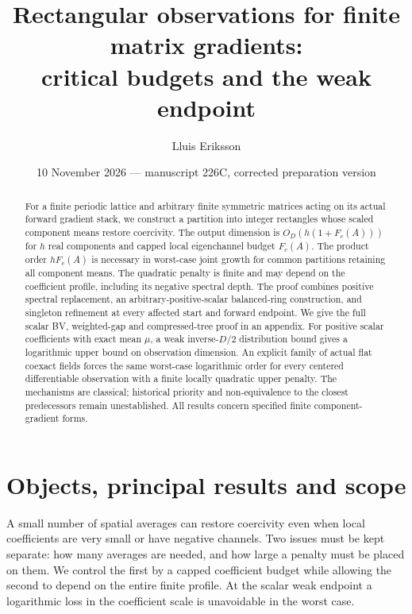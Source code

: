 \documentclass[11pt]{article}
\title{Rectangular observations for finite matrix gradients:\\critical budgets and the weak endpoint}
\author{Lluis Eriksson}
\date{10 November 2026 --- manuscript 226C, corrected preparation version}
\begin{document}
\maketitle
\begin{abstract}
For a finite periodic lattice and arbitrary finite symmetric matrices acting on
its actual forward gradient stack, we construct a partition into integer
rectangles whose scaled component means restore coercivity. The output
dimension is $O_D(h(1+F_c(A)))$ for $h$ real components and capped local
eigenchannel budget $F_c(A)$. The product order $hF_c(A)$ is necessary in
worst-case joint growth for common partitions retaining all component means. The quadratic penalty is finite and may
depend on the coefficient profile, including its negative spectral depth.
The proof combines positive spectral replacement, an arbitrary-positive-scalar
balanced-ring construction, and singleton refinement at every affected start
and forward endpoint. We give the full scalar BV, weighted-gap and compressed-tree
proof in an appendix. For positive scalar coefficients with exact mean $\mu$,
a weak inverse-$D/2$ distribution bound gives a logarithmic upper bound on
observation dimension. An explicit family of actual flat coexact fields
forces the same worst-case logarithmic order for every centered differentiable
observation with a finite locally quadratic upper penalty. The mechanisms are
classical; historical priority and non-equivalence to the closest predecessors
remain unestablished. All results concern specified finite component-gradient
forms.
\end{abstract}

\section{Objects, principal results and scope}\label{sec:main}
A small number of spatial averages can restore coercivity even when local
coefficients are very small or have negative channels. Two issues must be
kept separate: how many averages are needed, and how large a penalty must be
placed on them. We control the first by a capped coefficient budget while
allowing the second to depend on the entire finite profile. At the scalar
weak endpoint a logarithmic loss in the coefficient scale is unavoidable in
the worst case.
\end{document}
